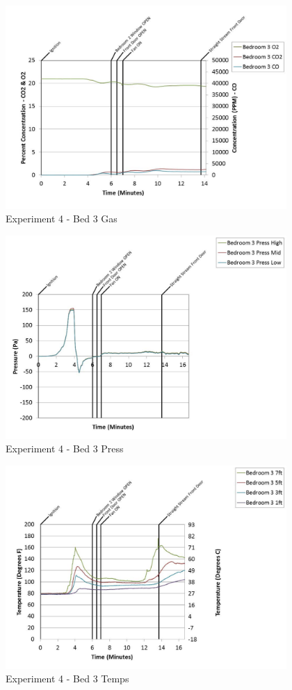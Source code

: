 \documentclass{article}
\begin{document}
\begin{appendices}
	\clearpage

	\begin{figure}[h!]
		\centering
		\includegraphics[height=3.05in]{0_Images/Results_Charts/Exp_4_Charts/Bed3Gas.pdf}
		\caption{Experiment 4 - Bed 3 Gas}
	\end{figure}
 

	\begin{figure}[h!]
		\centering
		\includegraphics[height=3.05in]{0_Images/Results_Charts/Exp_4_Charts/Bed3Press.pdf}
		\caption{Experiment 4 - Bed 3 Press}
	\end{figure}
 
	\clearpage

	\begin{figure}[h!]
		\centering
		\includegraphics[height=3.05in]{0_Images/Results_Charts/Exp_4_Charts/Bed3Temps.pdf}
		\caption{Experiment 4 - Bed 3 Temps}
	\end{figure}
 


\end{appendices}
\end{document}
